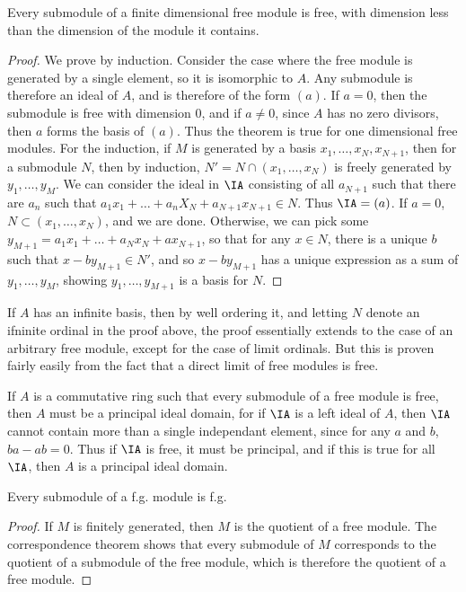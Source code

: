 \begin{theorem}
    Every submodule of a finite dimensional free module is free, with dimension less than the dimension of the module it contains.
\end{theorem}
\begin{proof}
    We prove by induction. Consider the case where the free module is generated by a single element, so it is isomorphic to $A$. Any submodule is therefore an ideal of $A$, and is therefore of the form $(a)$. If $a = 0$, then the submodule is free with dimension $0$, and if $a \neq 0$, since $A$ has no zero divisors, then $a$ forms the basis of $(a)$. Thus the theorem is true for one dimensional free modules. For the induction, if $M$ is generated by a basis $x_1, \dots, x_N, x_{N+1}$, then for a submodule $N$, then by induction, $N' = N \cap (x_1, \dots, x_N)$ is freely generated by $y_1, \dots, y_M$. We can consider the ideal in $\IA$ consisting of all $a_{N+1}$ such that there are $a_n$ such that $a_1x_1 + \dots + a_nX_N + a_{N+1} x_{N+1} \in N$. Thus $\IA = (a)$. If $a = 0$, $N \subset (x_1, \dots, x_N)$, and we are done. Otherwise, we can pick some $y_{M+1} = a_1x_1 + \dots + a_Nx_N + a x_{N+1}$, so that for any $x \in N$, there is a unique $b$ such that $x - by_{M+1} \in N'$, and so $x - by_{M+1}$ has a unique expression as a sum of $y_1, \dots, y_M$, showing $y_1, \dots, y_{M+1}$ is a basis for $N$.
\end{proof}

\begin{remark}
    If $A$ has an infinite basis, then by well ordering it, and letting $N$ denote an ifninite ordinal in the proof above, the proof essentially extends to the case of an arbitrary free module, except for the case of limit ordinals. But this is proven fairly easily from the fact that a direct limit of free modules is free.
\end{remark}

If $A$ is a commutative ring such that every submodule of a free module is free, then $A$ must be a principal ideal domain, for if $\IA$ is a left ideal of $A$, then $\IA$ cannot contain more than a single independant element, since for any $a$ and $b$, $ba - ab = 0$. Thus if $\IA$ is free, it must be principal, and if this is true for all $\IA$, then $A$ is a principal ideal domain.

\begin{corollary}
    Every submodule of a f.g. module is f.g.
\end{corollary}
\begin{proof}
    If $M$ is finitely generated, then $M$ is the quotient of a free module. The correspondence theorem shows that every submodule of $M$ corresponds to the quotient of a submodule of the free module, which is therefore the quotient of a free module.
\end{proof}

